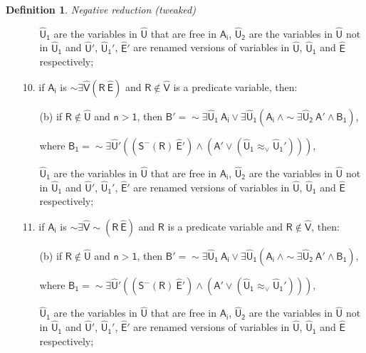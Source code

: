 \documentclass[inscr,ack,preface]{dithesis}
\theoremstyle{definition}
\newtheorem{definition}{Definition}[]
\newcommand{\msf}[1]{$\mathsf{#1}$}
\begin{document}
\begin{definition}{\emph{Negative reduction (tweaked)}}
\begin{enumerate}
\begin{enumerate}
                \msf{\widehat{U}_1} are the variables in \msf{\widehat{U}} that are free in \msf{A_i}, \msf{\widehat{U}_2} are the variables in \msf{\widehat{U}} not in \msf{\widehat{U}_1} and \msf{\widehat{U}'}, \msf{\widehat{U}_{1}'}, \msf{\widehat{E}'} are renamed versions of variables in \msf{\widehat{U}}, \msf{\widehat{U}_{1}} and \msf{\widehat{E}} respectively;
        \end{enumerate}
  \item[10.] if \msf{A_i} is \msf{\sim \exists \widehat{V} \left( R ~ \widehat{E} \right)} and \msf{R \not\in \widehat{V}} is a predicate variable,
        then:
        \begin{enumerate}
          \item[(b)] if \msf{R \not\in \widehat{U}} and \msf{n > 1},
                then \msf{B' = \sim \exists \widehat{U}_1 ~ A_i \lor \exists \widehat{U}_1 \left( A_i ~ \land \sim \exists \widehat{U}_2 ~ A' \land B_{1} \right)},

                where \msf{B_{1} = \sim\exists \widehat{U}' \left( \left( S^{-}\left( R \right) ~\widehat{E}' \right) \land \left( A' \lor \left( \widehat{U}_{1} \approx_{\lor} \widehat{U}_{1}' \right) \right) \right)},

                \msf{\widehat{U}_1} are the variables in \msf{\widehat{U}} that are free in \msf{A_i}, \msf{\widehat{U}_2} are the variables in \msf{\widehat{U}} not in \msf{\widehat{U}_1} and \msf{\widehat{U}'}, \msf{\widehat{U}_{1}'}, \msf{\widehat{E}'} are renamed versions of variables in \msf{\widehat{U}}, \msf{\widehat{U}_{1}} and \msf{\widehat{E}} respectively;
        \end{enumerate}
  \item[11.] if \msf{A_i} is \msf{\sim \exists \widehat{V} \sim \left( R ~ \widehat{E} \right)} and \msf{R} is a predicate variable and \msf{R \not\in \widehat{V}}, then:
        \begin{enumerate}
          \item[(b)] if \msf{R \not\in \widehat{U}} and \msf{n > 1},
                then \msf{B' = \sim \exists \widehat{U}_1 ~ A_i \lor \exists \widehat{U}_1 \left( A_i ~ \land \sim \exists \widehat{U}_2 ~ A' \land B_{1} \right)},

                where \msf{B_{1} = \sim\exists \widehat{U}' \left( \left( S^{-}\left( R \right) ~\widehat{E}' \right) \land \left( A' \lor \left( \widehat{U}_{1} \approx_{\lor} \widehat{U}_{1}' \right) \right) \right)},

                \msf{\widehat{U}_1} are the variables in \msf{\widehat{U}} that are free in \msf{A_i}, \msf{\widehat{U}_2} are the variables in \msf{\widehat{U}} not in \msf{\widehat{U}_1} and \msf{\widehat{U}'}, \msf{\widehat{U}_{1}'}, \msf{\widehat{E}'} are renamed versions of variables in \msf{\widehat{U}}, \msf{\widehat{U}_{1}} and \msf{\widehat{E}} respectively;
        \end{enumerate}
\end{enumerate}
\end{definition}
\end{document}
